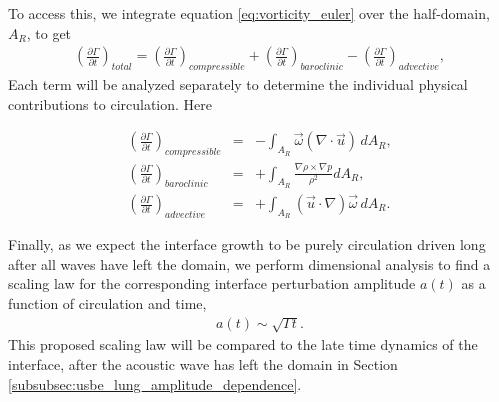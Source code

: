 To access this, we integrate equation \eqref{eq:vorticity_euler} over
the half-domain, $A_R$, to get
\begin{align} \label{eq:circulation_generation}
  \left(\frac{\partial \Gamma}{\partial t}\right)_{total} =%
  \left(\frac{\partial \Gamma}{\partial t}\right)_{compressible} + \left(\frac{\partial \Gamma}{\partial t}\right)_{baroclinic} - \left(\frac{\partial \Gamma}{\partial t}\right)_{advective},
\end{align}
%
Each term will be analyzed separately to determine the individual
physical contributions to circulation. Here
%
\addtocounter{equation}{-1}
\begin{subequations}\label{eq:circulation_generation_components}%
  \begin{align}%
    &\left(\frac{\partial \Gamma}{\partial t}\right)_{compressible} &=& -\int_{A_R} \vec{\omega}\left(\nabla\cdot\vec{u}\right) \, dA_R,&\\
    &\left(\frac{\partial \Gamma}{\partial t}\right)_{baroclinic} &=& +\int_{A_R} \frac{\nabla\rho\times\nabla p}{\rho^2} dA_R,&\\
    &\left(\frac{\partial \Gamma}{\partial t}\right)_{advective} &=& +\int_{A_R} \left(\vec{u}\cdot\nabla\right)\vec{\omega} \, dA_R.&
  \end{align}
\end{subequations}
%

Finally, as we expect the interface growth to be purely circulation driven
long after all waves have left the domain, we perform dimensional
analysis to find a scaling law for the corresponding interface
perturbation amplitude $a(t)$ as a function of circulation and time,
\begin{align} \label{eq:intf_circ_scaling}
  a(t) \sim \sqrt{\Gamma t}.
\end{align}
This proposed scaling law will be compared to the late time dynamics
of the interface, after the acoustic wave has left the domain in
Section \ref{subsubsec:usbe_lung_amplitude_dependence}.
















